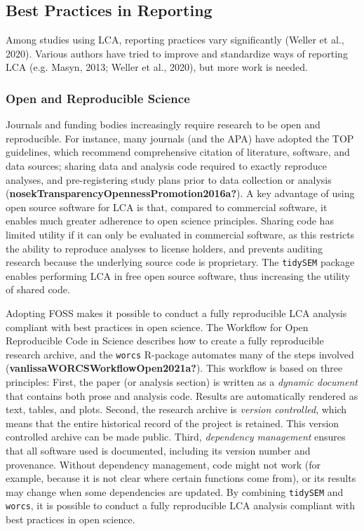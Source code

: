 \documentclass[
  ,man,floatsintext]{apa6}
\begin{document}
\hypertarget{best-practices-in-reporting}{%
\subsection{Best Practices in Reporting}\label{best-practices-in-reporting}}

Among studies using LCA, reporting practices vary significantly
(Weller et al., 2020).
Various authors have tried to improve and
standardize ways of reporting LCA (e.g. Masyn, 2013; Weller et al., 2020), but more work is needed.

\hypertarget{open-and-reproducible-science}{%
\subsubsection{Open and Reproducible Science}\label{open-and-reproducible-science}}

Journals and funding bodies increasingly require research to be open and reproducible.
For instance, many journals (and the APA) have adopted the TOP guidelines, which recommend comprehensive citation of literature, software, and data sources;
sharing data and analysis code required to exactly reproduce analyses,
and pre-registering study plans prior to data collection or analysis (\textbf{nosekTransparencyOpennessPromotion2016a?}).
A key advantage of using open source software for LCA is that, compared to commercial software, it enables much greater adherence to open science principles.
Sharing code has limited utility if it can only be evaluated in commercial software,
as this restricts the ability to reproduce analyses to license holders,
and prevents auditing research because the underlying source code is proprietary.
The \texttt{tidySEM} package enables performing LCA in free open source software,
thus increasing the utility of shared code.

Adopting FOSS makes it possible to conduct a fully reproducible LCA analysis compliant with best practices in open science.
The Workflow for Open Reproducible Code in Science describes how to create a fully reproducible research archive,
and the \texttt{worcs} R-package automates many of the steps involved (\textbf{vanlissaWORCSWorkflowOpen2021a?}).
This workflow is based on three principles: First,
the paper (or analysis section) is written as a \emph{dynamic document} that contains both prose and analysis code.
Results are automatically rendered as text, tables, and plots.
Second,
the research archive is \emph{version controlled}, which means that the entire historical record of the project is retained.
This version controlled archive can be made public.
Third, \emph{dependency management} ensures that all software used is documented, including its version number and provenance.
Without dependency management, code might not work (for example, because it is not clear where certain functions come from),
or its results may change when some dependencies are updated.
By combining \texttt{tidySEM} and \texttt{worcs},
it is possible to conduct a fully reproducible LCA analysis compliant with best practices in open science.
\end{document}
